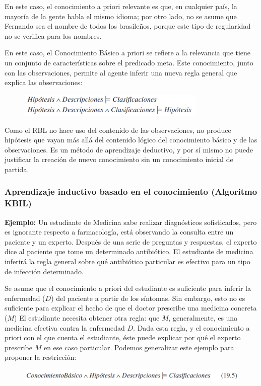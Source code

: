 \documentclass[12 pt, a4paper]{article}
\begin{document}
			En este caso, el conocimiento a priori relevante es que, en cualquier país, la mayoría de la gente habla el mismo idioma; por otro lado, no se asume que Fernando sea el nombre de todos los brasileños, porque este tipo de regularidad no se verifica para los nombres.

			En este caso, el Conocimiento Básico a priori se refiere a la relevancia que tiene un conjunto de características sobre el predicado meta. Este conocimiento, junto con las observaciones, permite al agente inferir una nueva regla general que explica las observaciones:
				\begin{figure}[h]
					\centering
					\includegraphics[width=0.8\textwidth]{./section2/fig4.png}
				\end{figure}
			
			Como el RBL no hace uso del contenido de las observaciones, no produce hipótesis que vayan más allá del contenido lógico del conocimiento básico y de las observaciones. Es un método de aprendizaje deductivo, y por sí mismo no puede justificar la creación de nuevo conocimiento sin un conocimiento inicial de partida.
			
			\subsubsection{Aprendizaje inductivo basado en el conocimiento (Algoritmo KBIL)}
			\textbf{Ejemplo:} Un estudiante de Medicina sabe realizar diagnósticos sofisticados, pero es ignorante respecto a farmacología, está observando la consulta entre un paciente y un experto. Después de una serie de preguntas y respuestas, el experto dice al paciente que tome un determinado antibiótico. El estudiante de medicina inferirá la regla general sobre qué antibiótico particular es efectivo para un tipo de infección determinado.
			
			Se asume que el conocimiento a priori del estudiante es suficiente para inferir la enfermedad ($D$) del paciente a partir de los síntomas. Sin embargo, esto no es suficiente para explicar el hecho de que el doctor prescribe una medicina concreta ($M$) El estudiante necesita obtener otra regla: que $M$, generalmente, es una medicina efectiva contra la enfermedad $D$. Dada esta regla, y el conocimiento a priori con el que cuenta el estudiante, éste puede explicar por qué el experto prescribe $M$ en ese caso particular. Podemos generalizar este ejemplo para proponer la restricción:
				\begin{figure}[h]
					\centering
					\includegraphics[width=1\textwidth]{./section2/fig5.png}
				\end{figure}
			
\end{document}
